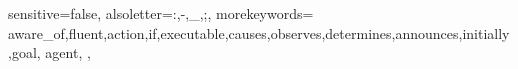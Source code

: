 {
  sensitive=false,    %
  alsoletter={:,-,_,;},   %
  morekeywords={
    aware_of,fluent,action,if,executable,causes,observes,determines,announces,initially,goal,
    agent,
  },
}